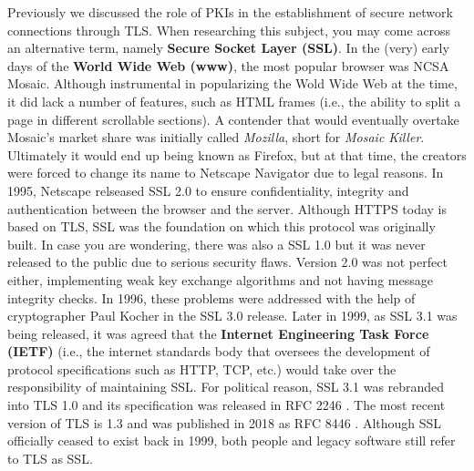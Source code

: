 Previously we discussed the role of PKIs in the establishment of secure network
connections through TLS. When researching this subject, you may come across an
alternative term, namely \textbf{Secure Socket Layer (SSL)}. In the (very) early
days of the \textbf{World Wide Web (www)}, the most popular browser was NCSA
Mosaic. Although instrumental in popularizing the Wold Wide Web at the time, it
did lack a number of features, such as HTML frames (i.e., the ability to split
a page in different scrollable sections). A contender that would eventually
overtake Mosaic's market share was initially called \textit{Mozilla}, short for
\textit{Mosaic Killer}. Ultimately it would end up being known as Firefox, but
at that time, the creators were forced to change its name to Netscape Navigator
due to legal reasons. In 1995, Netscape relseased SSL 2.0 to ensure
confidentiality, integrity and authentication between the browser and the
server. Although HTTPS today is based on TLS, SSL was the foundation on which
this protocol was originally built. In case you are wondering, there was also a
SSL 1.0 but it was never released to the public due to serious security flaws.
Version 2.0 was not perfect either, implementing weak key exchange algorithms
and not having message integrity checks. In 1996, these problems were addressed
with the help of cryptographer Paul Kocher in the SSL 3.0 release. Later in
1999, as SSL 3.1 was being released, it was agreed that the \textbf{Internet
Engineering Task Force (IETF)} (i.e., the internet standards body that oversees
the development of protocol specifications such as HTTP, TCP, etc.) would take
over the responsibility of maintaining SSL. For political reason, SSL 3.1 was
rebranded into TLS 1.0 and its specification was released in RFC 2246
\cite{dierks1999rfc2246}. The most recent version of TLS is 1.3 and was
published in 2018 as RFC 8446 \cite{rescorla2018rfc}. Although SSL officially
ceased to exist back in 1999, both people and legacy software still refer to TLS
as SSL.

